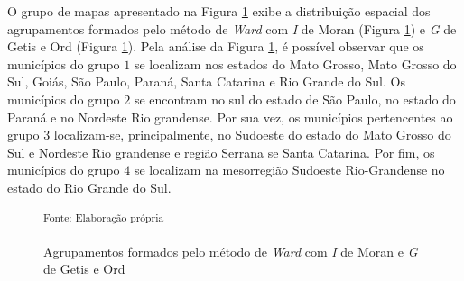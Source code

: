 \documentclass[
	12pt,				%
	openright,			%
	oneside,			%
	a4paper,			%
	chapter=TITLE,		%
	section=TITLE,		%
	english,			%
	french,				%
	spanish,			%
	brazil				%
	]{abntex2}
\begin{document}
O grupo de mapas apresentado na Figura \ref{cluster_ward} exibe a distribuição espacial dos agrupamentos formados pelo método de \textit{Ward} com \textit{I} de Moran (Figura \ref{cluster_ward}) e \textit{G} de Getis e Ord (Figura \ref{cluster_ward}). Pela análise da Figura \ref{cluster_ward}, é possível observar que os municípios do grupo $1$ se localizam nos estados do Mato Grosso, Mato Grosso do Sul, Goiás, São Paulo, Paraná, Santa Catarina e Rio Grande do Sul. Os municípios do grupo $2$ se encontram no sul do estado de São Paulo, no estado do Paraná e no Nordeste Rio grandense. Por sua vez, os municípios pertencentes ao grupo $3$ localizam-se, principalmente, no Sudoeste do estado do Mato Grosso do Sul e Nordeste Rio grandense e região Serrana se Santa Catarina. Por fim, os municípios do  grupo $4$ se localizam na mesorregião Sudoeste Rio-Grandense no estado do Rio Grande do Sul. 

\begin{figure}[h]
	\caption{Agrupamentos formados pelo método de \textit{Ward} com \textit{I} de Moran e \textit{G} de Getis e Ord}\label{cluster_ward}
	\begin{center}
	\end{center}
	\noindent \small \textsuperscript{Fonte: Elaboração própria}
\end{figure}
\end{document}
